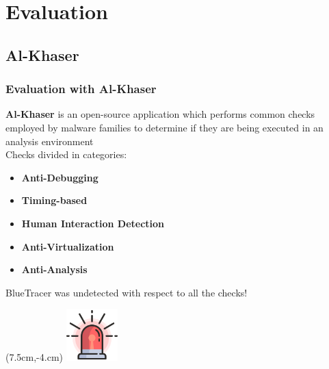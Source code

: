 \documentclass[compress]{beamer}
\begin{document}
\section{Evaluation}

\subsection{Al-Khaser}
\begin{frame}
    \frametitle{Evaluation with Al-Khaser}
	\textbf{Al-Khaser} is an open-source application which performs common checks employed by malware families to determine if they are being
executed in an analysis environment
\\\medskip
Checks divided in categories:
\begin{itemize}
\item \textbf{Anti-Debugging}
\item \textbf{Timing-based}
\item \textbf{Human Interaction Detection}
\item \textbf{Anti-Virtualization}
\item \textbf{Anti-Analysis}
\end{itemize}
\bigskip
\begin{beamerboxesrounded}[shadow=true]{}
BlueTracer was undetected with respect to all the checks!
\end{beamerboxesrounded}

    \begin{textblock*}{3cm}(7.5cm,-4.cm)
   \includegraphics[width=2cm]{image/lights.png}%
	\end{textblock*}

\end{frame}
\end{document}
